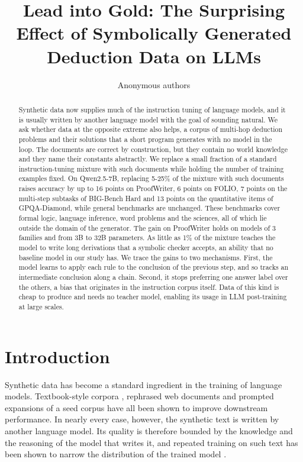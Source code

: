 \documentclass{article}
\title{Lead into Gold: The Surprising Effect of Symbolically Generated Deduction Data on LLMs}
\author{Anonymous authors}
\begin{document}
\maketitle

\begin{abstract}
Synthetic data now supplies much of the instruction tuning of language models, and it is usually written by another language model with the goal of sounding natural. We ask whether data at the opposite extreme also helps, a corpus of multi-hop deduction problems and their solutions that a short program generates with no model in the loop. The documents are correct by construction, but they contain no world knowledge and they name their constants abstractly. We replace a small fraction of a standard instruction-tuning mixture with such documents while holding the number of training examples fixed. On Qwen2.5-7B, replacing 5-25\% of the mixture with such documents raises accuracy by up to 16 points on ProofWriter, 6 points on FOLIO, 7 points on the multi-step subtasks of BIG-Bench Hard and 13 points on the quantitative items of GPQA-Diamond, while general benchmarks are unchanged. These benchmarks cover formal logic, language inference, word problems and the sciences, all of which lie outside the domain of the generator. The gain on ProofWriter holds on models of 3 families and from 3B to 32B parameters. As little as 1\% of the mixture teaches the model to write long derivations that a symbolic checker accepts, an ability that no baseline model in our study has. We trace the gains to two mechanisms. First, the model learns to apply each rule to the conclusion of the previous step, and so tracks an intermediate conclusion along a chain. Second, it stops preferring one answer label over the others, a bias that originates in the instruction corpus itself. Data of this kind is cheap to produce and needs no teacher model, enabling its usage in LLM post-training at large scales.
\end{abstract}



\section{Introduction}

Synthetic data has become a standard ingredient in the training of language
models. Textbook-style corpora \citep{gunasekar2023textbooks,
eldan2023tinystories, abdin2024phi4}, rephrased web documents
\citep{maini2024rephrasing, maini2025beyondweb, su2025nemotroncc} and
prompted expansions of a seed corpus \citep{yang2025synthetic} have all been
shown to improve downstream performance. In nearly every case, however, the
synthetic text is written by another language model. Its quality is therefore
bounded by the knowledge and the reasoning of the model that writes it, and
repeated training on such text has been shown to narrow the distribution of
the trained model \citep{shumailov2024collapse, dohmatob2025strong}.
\end{document}
